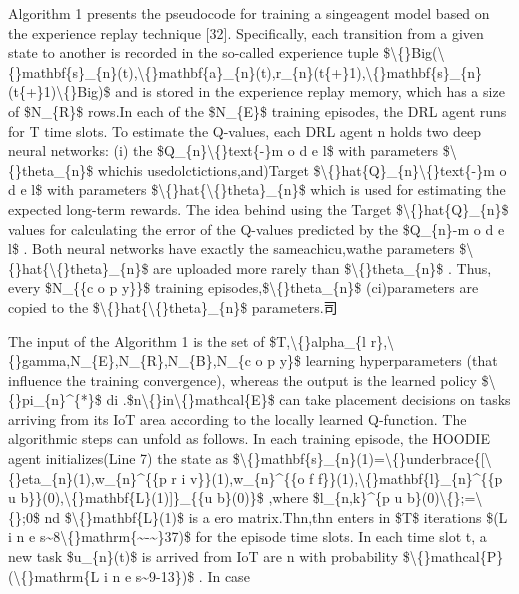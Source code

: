 \documentclass{article}
\begin{document}
Algorithm 1 presents the pseudocode for training a singeagent model based on the experience replay technique [32]. Specifically, each transition from a given state to another is recorded in the so-called experience tuple \$\textbackslash\{\}Big(\textbackslash\{\}mathbf\{s\}\_\{n\}(t),\textbackslash\{\}mathbf\{a\}\_\{n\}(t),r\_\{n\}(t\{+\}1),\textbackslash\{\}mathbf\{s\}\_\{n\}(t\{+\}1)\textbackslash\{\}Big)\$ and is stored in the experience replay memory, which has a size of \$N\_\{R\}\$ rows.In each of the \$N\_\{E\}\$ training episodes, the DRL agent runs for T time slots. To estimate the Q-values, each DRL agent n holds two deep neural networks: (i) the \$Q\_\{n\}\textbackslash\{\}text\{-\}m o d e l\$ with parameters \$\textbackslash\{\}theta\_\{n\}\$ whichis usedolctictions,and)Target \$\textbackslash\{\}hat\{Q\}\_\{n\}\textbackslash\{\}text\{-\}m o d e l\$ with parameters \$\textbackslash\{\}hat\{\textbackslash\{\}theta\}\_\{n\}\$ which is used for estimating the expected long-term rewards. The idea behind using the Target \$\textbackslash\{\}hat\{Q\}\_\{n\}\$ values for calculating the error of the Q-values predicted by the \$Q\_\{n\}-m o d e l\$ . Both neural networks have exactly the sameachicu,wathe parameters \$\textbackslash\{\}hat\{\textbackslash\{\}theta\}\_\{n\}\$ are uploaded more rarely than \$\textbackslash\{\}theta\_\{n\}\$ . Thus, every \$N\_\{\{c o p y\}\}\$ training episodes,\$\textbackslash\{\}theta\_\{n\}\$ (ci)parameters are copied to the \$\textbackslash\{\}hat\{\textbackslash\{\}theta\}\_\{n\}\$ parameters.司

The input of the Algorithm 1 is the set of \$T,\textbackslash\{\}alpha\_\{l r\},\textbackslash\{\}gamma,N\_\{E\},N\_\{R\},N\_\{B\},N\_\{c o p y\}\$ learning hyperparameters (that influence the training convergence), whereas the output is the learned policy \$\textbackslash\{\}pi\_\{n\}\textasciicircum{}\{*\}\$ di .\$n\textbackslash\{\}in\textbackslash\{\}mathcal\{E\}\$ can take placement decisions on tasks arriving from its IoT area according to the locally learned Q-function. The algorithmic steps can unfold as follows. In each training episode, the HOODIE agent initializes(Line 7) the state as \$\textbackslash\{\}mathbf\{s\}\_\{n\}(1)=\textbackslash\{\}underbrace\{[\textbackslash\{\}eta\_\{n\}(1),w\_\{n\}\textasciicircum{}\{\{p r i v\}\}(1),w\_\{n\}\textasciicircum{}\{\{o f f\}\}(1),\textbackslash\{\}mathbf\{l\}\_\{n\}\textasciicircum{}\{\{p u b\}\}(0),\textbackslash\{\}mathbf\{L\}(1)]\}\_\{\{u b\}(0)\}\$ ,where \$l\_\{n,k\}\textasciicircum{}\{p u b\}(0)\textbackslash\{\};=\textbackslash\{\};0\$  nd \$\textbackslash\{\}mathbf\{L\}(1)\$ is a ero matrix.Thn,thn enters in \$T\$ iterations \$(L i n e s\textasciitilde{}8\textbackslash\{\}mathrm\{\textasciitilde{}-\textasciitilde{}\}37)\$ for the episode time slots. In each time slot t, a new task \$u\_\{n\}(t)\$ is arrived from IoT are n with probability \$\textbackslash\{\}mathcal\{P\}(\textbackslash\{\}mathrm\{L i n e s\textasciitilde{}9-13\})\$ . In case
\end{document}

